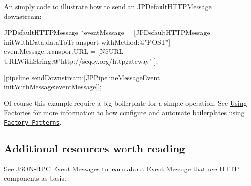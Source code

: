 An simply code to illustrate how to send an \hyperlink{a00012}{JPDefaultHTTPMessage} downstream: 
\begin{DoxyCode}
 JPDefaultHTTPMessage *eventMessage = [JPDefaultHTTPMessage initWithData:dataToTr
      ansport withMethod:@"POST"]
 eventMessage.transportURL = [NSURL URLWithString:@"http://seqoy.org/httpgateway"
      ];
 
 [pipeline sendDownstream:[JPPipelineMessageEvent initWithMessage:eventMessage]];
      
\end{DoxyCode}
 Of course this example require a big boilerplate for a simple operation. See \hyperlink{a00004}{Using Factories} for more information to how configure and automate boilerplates using \href{http://en.wikipedia.org/wiki/Factory_method_pattern}{\tt Factory Patterns}.

\subsection*{Additional resources worth reading}

See \hyperlink{a00008}{JSON-\/RPC Event Messages} to learn about \hyperlink{a00006}{Event Message} that use HTTP components as basis.

\par
 \par
    